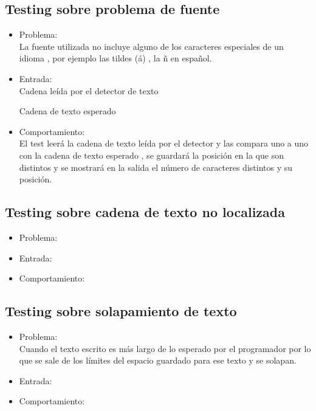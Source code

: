 \subsection{Testing sobre problema de fuente
}
\begin{itemize}
	\item Problema: \\
	La fuente utilizada no incluye alguno de los caracteres especiales de un idioma , por ejemplo las tildes (á) , la ñ en español.  \\
	\item Entrada: \\
	Cadena leída por el detector de texto
	
	Cadena de texto esperado
	
	\item Comportamiento: \\
	El test leerá la cadena de texto leída por el detector y las compara uno a uno con la cadena de texto esperado , se guardará la posición en la que son distintos y se mostrará en la salida el número de caracteres distintos y su posición.
	
\end{itemize}



\subsection{Testing sobre cadena de texto no localizada}
\begin{itemize}
	\item Problema: \\

	\item Entrada: \\

	\item Comportamiento: \\

\end{itemize}
\subsection{Testing sobre solapamiento de texto}

\begin{itemize}
	\item Problema: \\
	Cuando el texto escrito es más largo de lo esperado por el programador por lo que se sale de los límites del espacio guardado para ese texto y se solapan. \\
	\item Entrada: \\
	
	\item Comportamiento: \\
	
\end{itemize}
